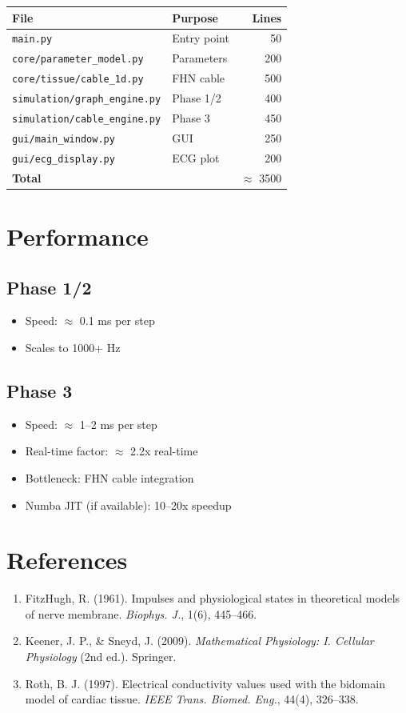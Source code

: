 \documentclass[12pt,a4paper]{article}
\begin{document}
\begin{tabular}{|l|l|r|}
\hline
\textbf{File} & \textbf{Purpose} & \textbf{Lines} \\
\hline
\texttt{main.py} & Entry point & 50 \\
\texttt{core/parameter\_model.py} & Parameters & 200 \\
\texttt{core/tissue/cable\_1d.py} & FHN cable & 500 \\
\texttt{simulation/graph\_engine.py} & Phase 1/2 & 400 \\
\texttt{simulation/cable\_engine.py} & Phase 3 & 450 \\
\texttt{gui/main\_window.py} & GUI & 250 \\
\texttt{gui/ecg\_display.py} & ECG plot & 200 \\
\textbf{Total} & & $\approx$ 3500 \\
\hline
\end{tabular}

\section{Performance}

\subsection{Phase 1/2}
\begin{itemize}
    \item Speed: $\approx$ 0.1 ms per step
    \item Scales to 1000+ Hz
\end{itemize}

\subsection{Phase 3}
\begin{itemize}
    \item Speed: $\approx$ 1--2 ms per step
    \item Real-time factor: $\approx$ 2.2x real-time
    \item Bottleneck: FHN cable integration
    \item Numba JIT (if available): 10--20x speedup
\end{itemize}

\section{References}

\begin{enumerate}
    \item FitzHugh, R. (1961). Impulses and physiological states in theoretical models of nerve membrane. \textit{Biophys. J.}, 1(6), 445--466.
    
    \item Keener, J. P., \& Sneyd, J. (2009). \textit{Mathematical Physiology: I. Cellular Physiology} (2nd ed.). Springer.
    
    \item Roth, B. J. (1997). Electrical conductivity values used with the bidomain model of cardiac tissue. \textit{IEEE Trans. Biomed. Eng.}, 44(4), 326--338.
\end{enumerate}
\end{document}
